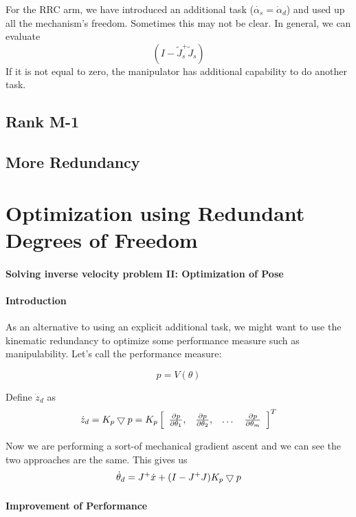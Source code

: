 For the RRC arm, we have introduced an additional task
($\dot{\alpha_s} = \dot{\alpha}_d$) and used up all the mechanism's
freedom.   Sometimes this may not be clear.  In general, we can evaluate
\[
(I-\tilde{J}_s^{+}\tilde{J}_s)
\]
If it is not equal to zero, the manipulator has additional capability to
do another task.




\subsection{Rank M-1}
\subsection{More Redundancy}

\section{Optimization using Redundant Degrees of Freedom}



\paragraph{Solving inverse velocity problem II: Optimization of Pose}

\paragraph{Introduction}
As an alternative to using an explicit additional task, we might want to use the
kinematic redundancy to optimize some performance measure such as
manipulability.  Let's call the performance measure:

\[
p = V(\theta)
\]


Define $\dot{z}_d$ as
\[
\dot{z}_d = K_p \bigtriangledown p = K_p
\left [
\begin{array}{cccc}
\frac{\partial p}{\partial \theta_1}, &
\frac{\partial p}{\partial \theta_2}, &
\dots &
\frac{\partial p}{\partial \theta_m}
\end{array}
\right ]^T
\]

Now we are performing a sort-of mechanical gradient ascent and we can
see the two  approaches are the same.   This gives us
\begin{equation}\label{GradSoln}
\dot{\theta}_d = J^{+}\dot{x} + (I-J^{+}J)K_p\bigtriangledown p
\end{equation}

\paragraph{Improvement of Performance}


